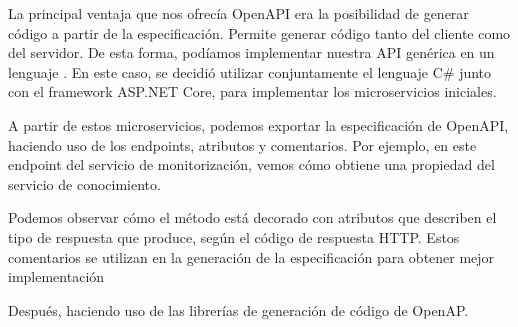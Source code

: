 La principal ventaja que nos ofrecía OpenAPI era la posibilidad de generar código a partir de la especificación. Permite generar código tanto del cliente como del servidor. De esta forma, podíamos implementar nuestra API genérica en un lenguaje . En este caso, se decidió utilizar conjuntamente el lenguaje C\# junto con el framework ASP.NET Core, para implementar los microservicios iniciales.

A partir de estos microservicios, podemos exportar la especificación de OpenAPI, haciendo uso de los endpoints, atributos y comentarios. Por ejemplo, en este endpoint del servicio de monitorización, vemos cómo obtiene una propiedad del servicio de conocimiento.

Podemos observar cómo el método está decorado con atributos que describen el tipo de respuesta que produce, según el código de respuesta HTTP. Estos comentarios se utilizan en la generación de la especificación para obtener mejor implementación

Después, haciendo uso de las librerías de generación de código de OpenAP.
